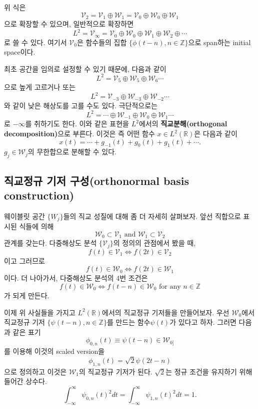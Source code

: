 \documentclass[b5paper,]{book}
\theoremstyle{definition}
\theoremstyle{definition}
\theoremstyle{definition}
\theoremstyle{remark}
\begin{document}
위 식은
\[\mathcal{V}_{2}=\mathcal{V}_{1}\oplus\mathcal{W}_{1}=\mathcal{V}_{0}\oplus\mathcal{W}_{0}\oplus\mathcal{W}_{1}\]
으로 확장할 수 있으며, 일반적으로 확장하면
\[L^{2}=\mathcal{V}_{\infty}=\mathcal{V}_{0}\oplus \mathcal{W}_{0} \oplus \mathcal{W}_{1} \oplus \mathcal{W}_{2} \oplus \cdots\]
로 쓸 수 있다. 여기서 \(\mathcal{V}_{0}\)은 함수들의 집합
\(\{ \phi(t-n), n\in\mathbb{Z}\}\)으로 span하는 initial space이다.

최초 공간을 임의로 설정할 수 있기 때문에, 다음과 같이
\[L^{2}=\mathcal{V}_{5}\oplus \mathcal{W}_{5} \oplus \mathcal{W}_{6}\cdots\]
으로 높게 고르거나 또는
\[L^{2}=\mathcal{V}_{-3}\oplus \mathcal{W}_{-3} \oplus \mathcal{W}_{-2}\cdots\]
와 같이 낮은 해상도를 고를 수도 있다. 극단적으로는
\[L^{2}=\cdots\oplus \mathcal{W}_{-1} \oplus \mathcal{W}_{0} \oplus \mathcal{W}_{1}\cdots\]
로 \(-\infty\)를 취하기도 한다. 이와 같은 표현을 \(L^{2}\)에서의
\textbf{직교분해(orthogonal decomposition)}으로 부른다. 이것은 즉 어떤
함수 \(x\in L^{2}(\mathbb{R})\)은 다음과 같이
\[x(t)=\cdots + g_{-1}(t)+g_{0}(t)+g_{1}(t)+\cdots .\]
\(g_{j}\in\mathcal{W}_{j}\)의 무한합으로 분해할 수 있다.

\subsection{직교정규 기저 구성(orthonormal basis
construction)}\label{--orthonormal-basis-construction}

웨이블릿 공간 \(\{ W_{j} \}\)들의 직교 성질에 대해 좀 더 자세히
살펴보자. 앞선 직합으로 표시된 식들에 의해
\[\mathcal{W}_{0}\subset \mathcal{V}_{1} \text{ and } \mathcal{W}_{1} \subset \mathcal{V}_{2}\]
관계를 갖는다. 다중해상도 분석 \(\{\mathcal{V}_{j}\}\)의 정의의 관점에서
봤을 때,
\[f(t)\in \mathcal{V}_{1} \Longleftrightarrow f(2t)\in \mathcal{V}_{2}\]
이고 그러므로
\[f(t)\in \mathcal{W}_{0} \Longleftrightarrow f(2t)\in \mathcal{W}_{1}\]
이다. 더 나아가서, 다중해상도 분석의 4번 조건은
\[f(t)\in \mathcal{W}_{0} \Longleftrightarrow f(t-n)\in\mathcal{W}_{0} \text{ for any } n\in\mathbb{Z}\]
가 되게 만든다.

이제 위 사실들을 가지고 \(L^{2}(\mathbb{R})\)에서의 직교정규 기저들을
만들어보자. 우선 \(\mathcal{W}_{0}\)에서 직교정규 기저
\(\{\psi(t-n),n\in\mathbb{Z}\}\)를 만드는 함수\(\psi(t)\)가 있다고 하자.
그러면 다음과 같은 표기
\[\phi_{0,n}(t)\equiv\psi(t-n)\in\mathcal{W}_{0]}\] 를 이용해 이것의
scaled version을 \[\phi_{1,n}(t)=\sqrt{2}\psi(2t-n)\] 으로 정의하고
이것은 \(\mathcal{W}_{1}\)의 직교정규 기저가 된다. \(\sqrt{2}\)는 정규
조건을 유지하기 위해 들어간 상수다.
\[\int_{-\infty}^{\infty}\psi_{0,n}(t)^{2}dt=\int_{-\infty}^{\infty}\psi_{1,n}(t)^{2}dt=1.\]
\end{document}
